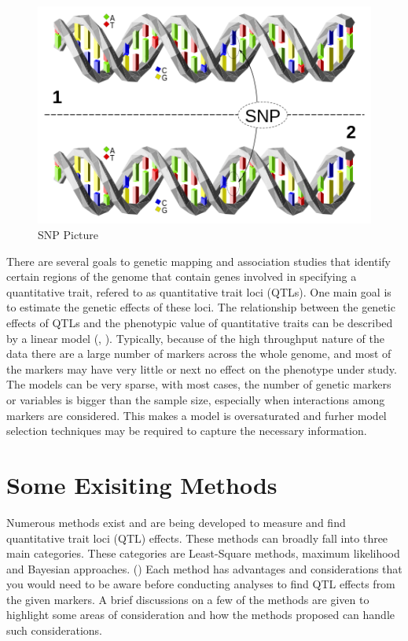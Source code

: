\documentclass[11pt,]{book}
\theoremstyle{definition}
\theoremstyle{definition}
\theoremstyle{remark}
\begin{document}
\begin{figure}

{\centering \includegraphics[width=0.8\linewidth]{images/SNP_Picture} 

}

\caption{SNP Picture}\label{fig:Snp-Pic}
\end{figure}

There are several goals to genetic mapping and association studies that
identify certain regions of the genome that contain genes involved in
specifying a quantitative trait, refered to as quantitative trait loci
(QTLs). One main goal is to estimate the genetic effects of these loci.
The relationship between the genetic effects of QTLs and the phenotypic
value of quantitative traits can be described by a linear model
(\cite{collard2005introduction}, \cite{xu2007empirical}). Typically,
because of the high throughput nature of the data there are a large
number of markers across the whole genome, and most of the markers may
have very little or next no effect on the phenotype under study. The
models can be very sparse, with most cases, the number of genetic
markers or variables is bigger than the sample size, especially when
interactions among markers are considered. This makes a model is
oversaturated and furher model selection techniques may be required to
capture the necessary information. \cite{dong2015accurate}

\section{Some Exisiting Methods}\label{some-exisiting-methods}

Numerous methods exist and are being developed to measure and find
quantitative trait loci (QTL) effects. These methods can broadly fall
into three main categories. These categories are Least-Square methods,
maximum likelihood and Bayesian approaches. (\cite{wu2007statistical})
Each method has advantages and considerations that you would need to be
aware before conducting analyses to find QTL effects from the given
markers. A brief discussions on a few of the methods are given to
highlight some areas of consideration and how the methods proposed can
handle such considerations.
\end{document}
